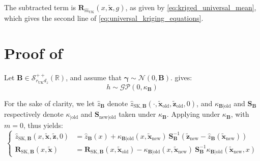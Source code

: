 The subtracted term is $\mathbf{R}_{\hat{m}_{\mathrm{UK}}}(x,\tilde{\mathbf{x}},g)$, as given by \eqref{eq:kriged_universal_mean}, which gives the second line of \eqref{eq:universal_kriging_equations}.

\section[Proof of Proposition 3.14]{Proof of }\label{sec:proof_UK_update}

Let $\mathbf{B}\in\mathcal{S}_{r_{\mathrm{UK}}d_z}^{++}(\mathbb{R})$, and assume that $\boldsymbol{\gamma}\sim\mathcal{N}(0,\mathbf{B})$.  gives:
\begin{equation}
	h\sim\mathcal{GP}(0,\kappa_{\mathbf{B}})
\end{equation}

For the sake of clarity, we let $\hat{z}_{\mathbf{B}}$ denote $\hat{z}_{\mathrm{SK},\mathbf{B}}(\cdot,\tilde{\mathbf{x}}_{\mathrm{old}},\tilde{\mathbf{z}}_{\mathrm{old}},0)$, and $\kappa_{\mathbf{B}|\mathrm{old}}$ and $\mathbf{S}_{\mathbf{B}}$ respectively denote $\kappa_{|\mathrm{old}}$ and $\mathbf{S}_{\mathrm{new}|\mathrm{old}}$ taken under $\kappa_{\mathbf{B}}$. Applying  under $\kappa_{\mathbf{B}}$, with $m=0$, thus yields:
\begin{equation}
	\left\{\begin{aligned}
	\hat{z}_{\mathrm{SK},\mathbf{B}}(x,\tilde{\mathbf{x}},\tilde{\mathbf{z}},0)&=\hat{z}_{\mathbf{B}}(x)+\kappa_{\mathbf{B}|\mathrm{old}}(x,\tilde{\mathbf{x}}_{\mathrm{new}})\:\mathbf{S}_{\mathbf{B}}^{-1}\left(\tilde{\mathbf{z}}_{\mathrm{new}}-\hat{z}_{\mathbf{B}}(\tilde{\mathbf{x}}_{\mathrm{new}})\right)\\
	\mathbf{R}_{\mathrm{SK},\mathbf{B}}(x,\tilde{\mathbf{x}})&=\mathbf{R}_{\mathrm{SK},\mathbf{B}}(x,\tilde{\mathbf{x}}_{\mathrm{old}})-\kappa_{\mathbf{B}|\mathrm{old}}(x,\tilde{\mathbf{x}}_{\mathrm{new}})\:\mathbf{S}_{\mathbf{B}}^{-1}\kappa_{\mathbf{B}|\mathrm{old}}(\tilde{\mathbf{x}}_{\mathrm{new}},x)
	\end{aligned}\right.
\end{equation}

